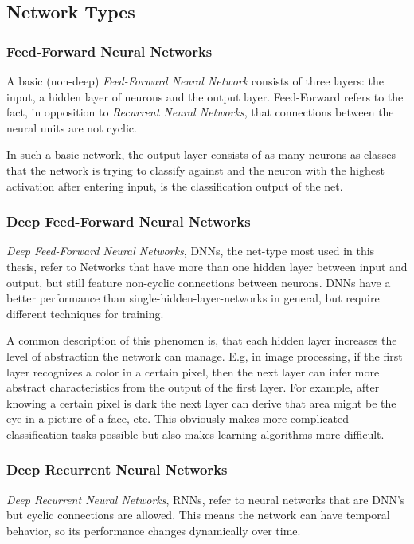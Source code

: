 \subsection{Network Types}
\label{sec:fund:types}

\subsubsection{Feed-Forward Neural Networks}
A basic (non-deep) \textit{Feed-Forward Neural Network} consists of three layers: the input, a hidden layer of neurons and the output layer. Feed-Forward refers to the fact, in opposition to \textit{Recurrent Neural Networks}, that connections between the neural units are not cyclic. 

In such a basic network, the output layer consists of as many neurons as classes that the network is trying to classify against and the neuron with the highest activation after entering input, is the classification output of the net.

\subsubsection{Deep Feed-Forward Neural Networks}
\textit{Deep Feed-Forward Neural Networks}, DNNs, the net-type most used in this thesis, refer to Networks that have more than one hidden layer between input and output, but still feature non-cyclic connections between neurons. DNNs have a better performance than single-hidden-layer-networks in general, but require different techniques for training. 

A common description of this phenomen is, that each hidden layer increases the level of abstraction the network can manage. E.g, in image processing, if the first layer recognizes a color in a certain pixel, then the next layer can infer more abstract characteristics from the output of the first layer. For example, after knowing a certain pixel is dark the next layer can derive that area might be the eye in a picture of a face, etc. This obviously makes more complicated classification tasks possible but also makes learning algorithms more difficult.

\subsubsection{Deep Recurrent Neural Networks}
\textit{Deep Recurrent Neural Networks}, RNNs, refer to neural networks that are DNN's but cyclic connections are allowed. This means the network can have temporal behavior, so its performance changes dynamically over time.


